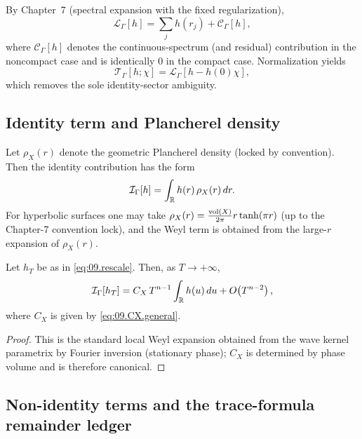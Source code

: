 By Chapter~7 (spectral expansion with the fixed regularization),
\begin{equation}\label{eq:09.L.spectral}
\mathcal L_\Gamma[h]
=
\sum_j h(r_j)
+\mathcal C_\Gamma[h],
\end{equation}
where $\mathcal C_\Gamma[h]$ denotes the continuous-spectrum (and residual) contribution in the noncompact case
and is identically $0$ in the compact case.
Normalization yields
\[
\mathcal T_\Gamma[h;\chi]=\mathcal L_\Gamma[h-h(0)\chi],
\]
which removes the sole identity-sector ambiguity.

\subsection{Identity term and Plancherel density}\label{subsec:09.identity-term}

Let $\rho_X(r)$ denote the geometric Plancherel density (locked by convention). Then the identity contribution has the form
\begin{equation}\label{eq:09.identity.term}
\mathcal I_\Gamma[h]=\int_{\mathbb{R}} h(r)\,\rho_X(r)\,dr.
\end{equation}
For hyperbolic surfaces one may take $\rho_X(r)=\frac{\mathop{\mathrm{vol}}\nolimits(X)}{2\pi}r\tanh(\pi r)$ (up to the Chapter-7 convention lock),
and the Weyl term is obtained from the large-$r$ expansion of $\rho_X(r)$.

\begin{lemma}\label{lem:09.identity-asymptotic}
Let $h_T$ be as in \eqref{eq:09.rescale}. Then, as $T\to+\infty$,
\begin{equation}\label{eq:09.identity.asymp}
\mathcal I_\Gamma[h_T]
=
C_X\,T^{n-1}\int_{\mathbb{R}} h(u)\,du
+
O\!\left(T^{n-2}\right),
\end{equation}
where $C_X$ is given by \eqref{eq:09.CX.general}.
\end{lemma}

\begin{proof}
This is the standard local Weyl expansion obtained from the wave kernel parametrix by Fourier inversion (stationary phase);
$C_X$ is determined by phase volume and is therefore canonical.
\end{proof}

\subsection{Non-identity terms and the trace-formula remainder ledger}\label{subsec:09.nonidentity}

